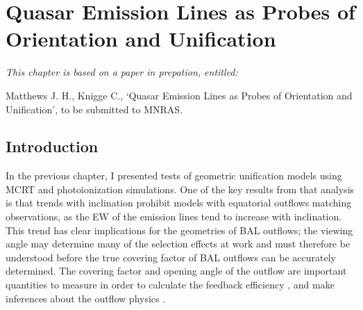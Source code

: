 \chapter{Quasar Emission Lines as Probes of Orientation and Unification}

\def\py{\textsc{python}}
\def\tar{\textsc{tardis}}
\def\cld{\textsc{cloudy}}
\def\agn{\textsc{agnspec}}
\def\kerrtrans{\textsc{kerrtrans}}


\def\civ{C~\textsc{iv}}
\def\nv{N~\textsc{v}}
\def\heii{He~\textsc{ii}}
\def\ovi{O~\textsc{vi}}
\def\la{Ly$\alpha$}
\def\ha{H$\alpha$}
\def\oiii{O~\textsc{iii}}
\def\oiiifull{O~\textsc{iii}~5007\AA}
\def\fwh{FWHM[H$\beta$]}
\def\ewo{EW[O~\textsc{iii}]}
\def\ept{$\epsilon(\theta)$}

\def\araa{ARAA}
\def\nat{Nature}
\def\apjl{ApJ Letters}
\def\aapr{AAPR}
\def\ssr{SSR}
\def\apj{ApJ}
\def\apjs{ApJs}
\def\pasp{PASP}
\def\aap{A\&A}
\def\mnras{MNRAS}
\def\aj{AJ}
\def\rmxaa{RMXAA}
\def\ew{{\rm EW}}

{\em This chapter is based on a paper in prepation, entitled:

Matthews J. H., Knigge C., 
`Quasar Emission Lines as Probes of Orientation and Unification',
to be submitted to MNRAS.}


%
%
\maketitle

\section{Introduction}

In the previous chapter, I presented tests of geometric unification
models using MCRT and photoionization simulations. 
One of the key results from that analysis is that trends with
inclination prohibit models with equatorial outflows matching
observations, as the EW of the emission lines tend
to increase with inclination. This trend has clear implications for
the geometries of BAL outflows; the viewing angle may determine many
of the selection effects at work and must therefore be understood
before the true covering factor of BAL outflows can be accurately 
determined. The covering factor and opening angle of the outflow
are important quantities to measure in order to calculate the
feedback efficiency \citep[e.g.][]{borguet2012}, 
and make inferences about the outflow physics \citep[e.g.][]{proga2005}. 

